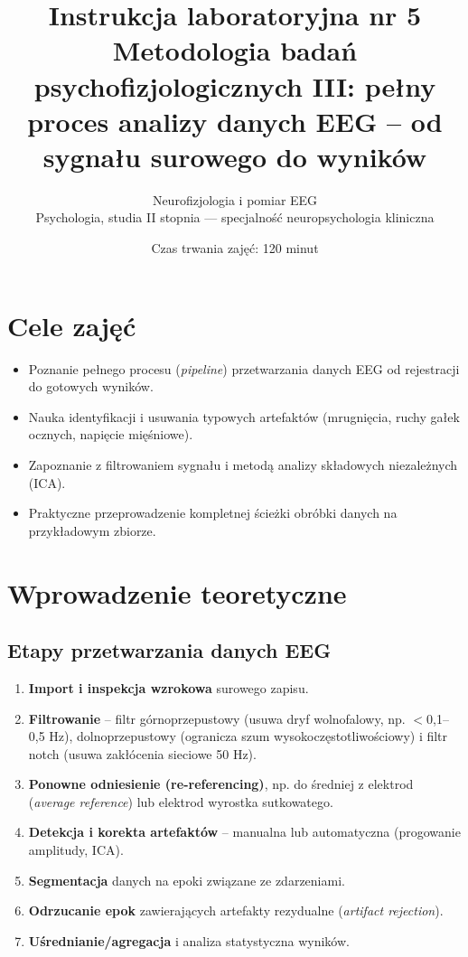 \documentclass[11pt,a4paper]{article}
\title{\vspace{-1.5cm}\textbf{\color{navy}Instrukcja laboratoryjna nr 5}\\[4pt]
\Large Metodologia badań psychofizjologicznych III: pełny proces analizy danych EEG -- od sygnału surowego do wyników}
\author{Neurofizjologia i pomiar EEG\\ Psychologia, studia II stopnia --- specjalność neuropsychologia kliniczna}
\date{Czas trwania zajęć: 120 minut}
\begin{document}
\maketitle
\thispagestyle{fancy}

\section{Cele zajęć}
\begin{itemize}[nosep]
  \item Poznanie pełnego procesu (\emph{pipeline}) przetwarzania danych EEG od rejestracji do gotowych wyników.
  \item Nauka identyfikacji i usuwania typowych artefaktów (mrugnięcia, ruchy gałek ocznych, napięcie mięśniowe).
  \item Zapoznanie z filtrowaniem sygnału i metodą analizy składowych niezależnych (ICA).
  \item Praktyczne przeprowadzenie kompletnej ścieżki obróbki danych na przykładowym zbiorze.
\end{itemize}

\section{Wprowadzenie teoretyczne}

\subsection{Etapy przetwarzania danych EEG}
\begin{enumerate}[nosep]
  \item \textbf{Import i inspekcja wzrokowa} surowego zapisu.
  \item \textbf{Filtrowanie} -- filtr górnoprzepustowy (usuwa dryf wolnofalowy, np. $<$0,1--0,5 Hz), dolnoprzepustowy (ogranicza szum wysokoczęstotliwościowy) i filtr notch (usuwa zakłócenia sieciowe 50 Hz).
  \item \textbf{Ponowne odniesienie (re-referencing)}, np. do średniej z elektrod (\emph{average reference}) lub elektrod wyrostka sutkowatego.
  \item \textbf{Detekcja i korekta artefaktów} -- manualna lub automatyczna (progowanie amplitudy, ICA).
  \item \textbf{Segmentacja} danych na epoki związane ze zdarzeniami.
  \item \textbf{Odrzucanie epok} zawierających artefakty rezydualne (\emph{artifact rejection}).
  \item \textbf{Uśrednianie/agregacja} i analiza statystyczna wyników.
\end{enumerate}
\end{document}
